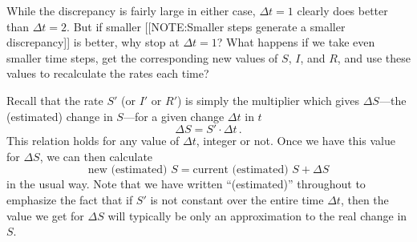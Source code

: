 While the discrepancy is fairly large in either case, $\Delta t=1$
clearly does better than $\Delta t=2$.  But if smaller
[[NOTE:Smaller steps generate a smaller discrepancy]]
is better, why stop at $\Delta t=1$?  What happens if we take even
smaller time steps, get the corresponding new values of $S$, $I$, and
$R$, and use these values to recalculate the rates each time?

Recall that the rate $S'$ (or $I'$ or $R'$) is simply the multiplier
which gives $\Delta S$---the (estimated) change in $S$---for a given
change $\Delta t$ in $t$
\[
\Delta S = S'\cdot \Delta t\, .
\]
This relation holds for any value of $\Delta t$, integer or not.  Once
we have this value for $\Delta S$, we can then calculate
\[
\mbox{new (estimated) } S = \mbox{current (estimated) } S + \Delta S
\]
in the usual way.  Note that we have written ``(estimated)''
throughout to emphasize the fact that if $S'$ is not constant over the
entire time $\Delta t$, then the value we get for $\Delta S$ will
typically be only an approximation to the real change in $S$.


